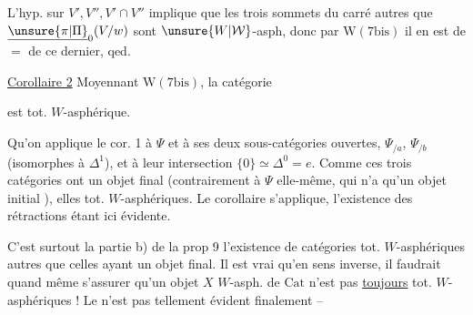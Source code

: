 
L'hyp. sur $V',V'',V'\cap V''$ implique que les trois sommets du carré autres que $\underline{\unsure{\pi|\Pi}}_0(V/w)$ sont $\unsure{W|\mathcal W}$-asph, donc par $\mathrm W(7\mathrm{bis})$ il en est de $=$ de ce dernier, qed.


\uline{Corollaire 2} Moyennant $\mathrm W(7\mathrm{bis})$, la catégorie



est tot. $W$-asphérique.


Qu'on applique le cor. 1 à $\Psi$ et à ses deux sous-catégories ouvertes, $\Psi_{/a}$, $\Psi_{/b}$ (isomorphes à $\Delta^1$), et à leur intersection $\{0\}\simeq\Delta^0=e$. Comme ces trois catégories ont un objet final (contrairement à $\Psi$ elle-même, qui n'a qu'un objet initial ), elles  tot. $W$-asphériques. Le corollaire s'applique, l'existence des rétractions  étant ici évidente.


C'est surtout la partie b)  de la prop 9  l'existence de catégories tot. $W$-asphériques autres que celles ayant un objet final. Il est vrai qu'en sens inverse, il faudrait quand même s'assurer qu'un objet $X$ $W$-asph. de $\mathrm{Cat}$ n'est pas \uline{toujours} tot. $W$-asphériques ! Le  n'est pas tellement évident finalement --
